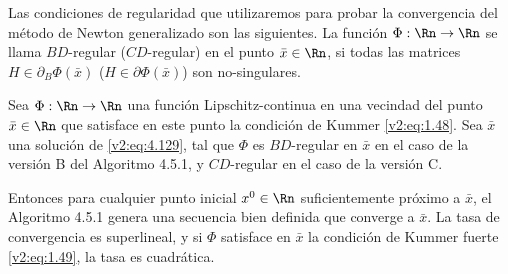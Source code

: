Las condiciones de regularidad que utilizaremos para probar la convergencia del método de Newton generalizado son las siguientes.
La función $\Phi : \Rn \to \Rn$ se llama $BD$-regular ($CD$-regular) en el punto $\bar{x} \in \Rn$, si todas las matrices $H \in \partial_B \Phi(\bar{x})$ ($H \in \partial \Phi(\bar{x})$) son no-singulares.

\begin{theorem}\label{v2:thm:4.5.1}
    Sea $\Phi : \Rn \to \Rn$ una función Lipschitz-continua en una vecindad del punto $\bar{x} \in \Rn$ que satisface en este punto la condición de Kummer \eqref{v2:eq:1.48}. Sea $\bar{x}$ una solución de \eqref{v2:eq:4.129}, tal que $\Phi$ es $BD$-regular en $\bar{x}$ en el caso de la versión B del Algoritmo 4.5.1, y $CD$-regular en el caso de la versión C.
    
    Entonces para cualquier punto inicial $x^0 \in \Rn$ suficientemente próximo a $\bar{x}$, el Algoritmo 4.5.1 genera una secuencia bien definida que converge a $\bar{x}$. La tasa de convergencia es superlineal, y si $\Phi$ satisface en $\bar{x}$ la condición de Kummer fuerte \eqref{v2:eq:1.49}, la tasa es cuadrática.
\end{theorem}

